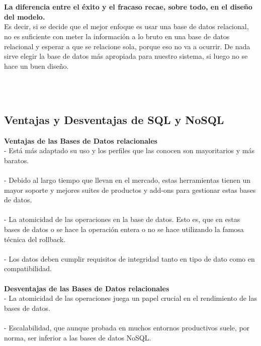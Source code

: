 \documentclass[twoside,twocolumn]{article}
\begin{document}
\begin{flushright}
\begin{itemize}
\textbf{}\\
\textbf{}\\
\textbf{La diferencia entre el éxito y el fracaso recae, sobre todo, en el diseño del modelo.}\\  Es decir, si se decide que el mejor enfoque es usar una base de datos relacional, no es suficiente con meter la información a lo bruto en una base de datos relacional y esperar a que se relacione sola, porque eso no va a ocurrir. De nada sirve elegir la base de datos más apropiada para nuestro sistema, si luego no se hace un buen diseño.

\textbf{}\\
\textbf{}\\



\subsection{Ventajas y Desventajas de SQL y NoSQL}
\textbf{Ventajas de las Bases de Datos relacionales}\\

-	Está más adaptado su uso y los perfiles que las conocen son mayoritarios y más baratos.\\
\textbf{}\\
-	Debido al largo tiempo que llevan en el mercado, estas herramientas tienen un mayor soporte y mejores suites de productos y add-ons para gestionar estas bases de datos.\\
\textbf{}\\
-	La atomicidad de las operaciones en la base de datos. Esto es, que en estas bases de datos o se hace la operación entera o no se hace utilizando la famosa técnica del rollback.\\
\textbf{}\\
-	Los datos deben cumplir requisitos de integridad tanto en tipo de dato como en compatibilidad.\\
\textbf{}\\

\textbf{Desventajas de las Bases de Datos relacionales}\\

-	La atomicidad de las operaciones juega un papel crucial en el rendimiento de las bases de datos.\\
\textbf{}\\
-	Escalabilidad, que aunque probada en muchos entornos productivos suele, por norma, ser inferior a las bases de datos NoSQL.\\


\end{itemize}
\end{flushright}
\end{document}
